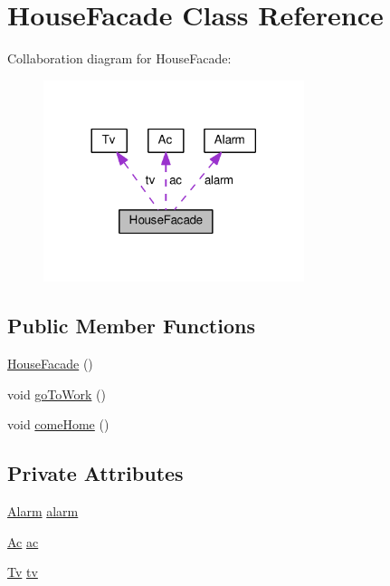 \hypertarget{classHouseFacade}{}\section{House\+Facade Class Reference}
\label{classHouseFacade}


Collaboration diagram for House\+Facade\+:
\nopagebreak
\begin{figure}[H]
\begin{center}
\leavevmode
\includegraphics[width=216pt]{classHouseFacade__coll__graph}
\end{center}
\end{figure}
\subsection*{Public Member Functions}
\begin{DoxyCompactItemize}
\item 
\hyperlink{classHouseFacade_abab7c9304c5123ad2894a86d071a4e51}{House\+Facade} ()
\item 
void \hyperlink{classHouseFacade_af62723fc617325d0ea4918349cb66dbb}{go\+To\+Work} ()
\item 
void \hyperlink{classHouseFacade_a806337202c3a039456a180777d034684}{come\+Home} ()
\end{DoxyCompactItemize}
\subsection*{Private Attributes}
\begin{DoxyCompactItemize}
\item 
\hyperlink{classAlarm}{Alarm} \hyperlink{classHouseFacade_a9635b0a634d8fc7be556c9dd33782cb9}{alarm}
\item 
\hyperlink{classAc}{Ac} \hyperlink{classHouseFacade_a6d30f8878c9f220d37f5866084466d35}{ac}
\item 
\hyperlink{classTv}{Tv} \hyperlink{classHouseFacade_a58d2375afc4bed9ae74bd18cf4dd79ef}{tv}
\end{DoxyCompactItemize}


